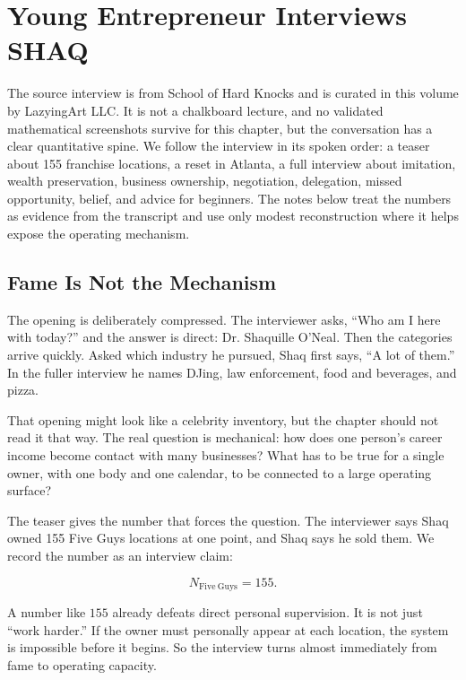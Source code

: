 \chapter{Young Entrepreneur Interviews SHAQ}

The source interview is from School of Hard Knocks and is curated in this volume by LazyingArt LLC. It is not a chalkboard lecture, and no validated mathematical screenshots survive for this chapter, but the conversation has a clear quantitative spine. We follow the interview in its spoken order: a teaser about 155 franchise locations, a reset in Atlanta, a full interview about imitation, wealth preservation, business ownership, negotiation, delegation, missed opportunity, belief, and advice for beginners. The notes below treat the numbers as evidence from the transcript and use only modest reconstruction where it helps expose the operating mechanism.

\section{Fame Is Not the Mechanism}

The opening is deliberately compressed. The interviewer asks, ``Who am I here with today?'' and the answer is direct: Dr. Shaquille O'Neal. Then the categories arrive quickly. Asked which industry he pursued, Shaq first says, ``A lot of them.'' In the fuller interview he names DJing, law enforcement, food and beverages, and pizza.

That opening might look like a celebrity inventory, but the chapter should not read it that way. The real question is mechanical: how does one person's career income become contact with many businesses? What has to be true for a single owner, with one body and one calendar, to be connected to a large operating surface?

The teaser gives the number that forces the question. The interviewer says Shaq owned 155 Five Guys locations at one point, and Shaq says he sold them. We record the number as an interview claim:

\begin{equation}
N_{\mathrm{Five\ Guys}} = 155.
\end{equation}

A number like \(155\) already defeats direct personal supervision. It is not just ``work harder.'' If the owner must personally appear at each location, the system is impossible before it begins. So the interview turns almost immediately from fame to operating capacity.

